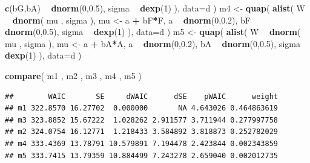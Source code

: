 \documentclass[
]{article}
\newenvironment{Shaded}{\begin{snugshade}}{\end{snugshade}}
\newcommand{\DataTypeTok}[1]{\textcolor[rgb]{0.13,0.29,0.53}{#1}}
\newcommand{\DecValTok}[1]{\textcolor[rgb]{0.00,0.00,0.81}{#1}}
\newcommand{\FloatTok}[1]{\textcolor[rgb]{0.00,0.00,0.81}{#1}}
\newcommand{\KeywordTok}[1]{\textcolor[rgb]{0.13,0.29,0.53}{\textbf{#1}}}
\newcommand{\NormalTok}[1]{#1}
\newcommand{\OperatorTok}[1]{\textcolor[rgb]{0.81,0.36,0.00}{\textbf{#1}}}
\newcommand{\StringTok}[1]{\textcolor[rgb]{0.31,0.60,0.02}{#1}}
\begin{document}
\begin{Shaded}
\begin{Highlighting}[]
        \KeywordTok{c}\NormalTok{(bG,bA) }\OperatorTok{~}\StringTok{ }\KeywordTok{dnorm}\NormalTok{(}\DecValTok{0}\NormalTok{,}\FloatTok{0.5}\NormalTok{),}
\NormalTok{        sigma }\OperatorTok{~}\StringTok{ }\KeywordTok{dexp}\NormalTok{(}\DecValTok{1}\NormalTok{)}
\NormalTok{    ), }\DataTypeTok{data=}\NormalTok{d )}
\NormalTok{m4 <-}\StringTok{ }\KeywordTok{quap}\NormalTok{(}
    \KeywordTok{alist}\NormalTok{(}
\NormalTok{        W }\OperatorTok{~}\StringTok{ }\KeywordTok{dnorm}\NormalTok{( mu , sigma ),}
\NormalTok{        mu <-}\StringTok{ }\NormalTok{a }\OperatorTok{+}\StringTok{ }\NormalTok{bF}\OperatorTok{*}\NormalTok{F,}
\NormalTok{        a }\OperatorTok{~}\StringTok{ }\KeywordTok{dnorm}\NormalTok{(}\DecValTok{0}\NormalTok{,}\FloatTok{0.2}\NormalTok{),}
\NormalTok{        bF }\OperatorTok{~}\StringTok{ }\KeywordTok{dnorm}\NormalTok{(}\DecValTok{0}\NormalTok{,}\FloatTok{0.5}\NormalTok{),}
\NormalTok{        sigma }\OperatorTok{~}\StringTok{ }\KeywordTok{dexp}\NormalTok{(}\DecValTok{1}\NormalTok{)}
\NormalTok{    ), }\DataTypeTok{data=}\NormalTok{d )}
\NormalTok{m5 <-}\StringTok{ }\KeywordTok{quap}\NormalTok{(}
    \KeywordTok{alist}\NormalTok{(}
\NormalTok{        W }\OperatorTok{~}\StringTok{ }\KeywordTok{dnorm}\NormalTok{( mu , sigma ),}
\NormalTok{        mu <-}\StringTok{ }\NormalTok{a }\OperatorTok{+}\StringTok{ }\NormalTok{bA}\OperatorTok{*}\NormalTok{A,}
\NormalTok{        a }\OperatorTok{~}\StringTok{ }\KeywordTok{dnorm}\NormalTok{(}\DecValTok{0}\NormalTok{,}\FloatTok{0.2}\NormalTok{),}
\NormalTok{        bA }\OperatorTok{~}\StringTok{ }\KeywordTok{dnorm}\NormalTok{(}\DecValTok{0}\NormalTok{,}\FloatTok{0.5}\NormalTok{),}
\NormalTok{        sigma }\OperatorTok{~}\StringTok{ }\KeywordTok{dexp}\NormalTok{(}\DecValTok{1}\NormalTok{)}
\NormalTok{), }\DataTypeTok{data=}\NormalTok{d )}


 \KeywordTok{compare}\NormalTok{( m1 , m2 , m3 , m4 , m5 )}
\end{Highlighting}
\end{Shaded}

\begin{verbatim}
##        WAIC       SE     dWAIC      dSE    pWAIC      weight
## m1 322.8570 16.27702  0.000000       NA 4.643026 0.464863619
## m3 323.8852 15.67222  1.028262 2.911577 3.711944 0.277997758
## m2 324.0754 16.12771  1.218433 3.584892 3.818873 0.252782029
## m4 333.4369 13.78791 10.579891 7.194478 2.423844 0.002343859
## m5 333.7415 13.79359 10.884499 7.243278 2.659040 0.002012735
\end{verbatim}
\end{document}
